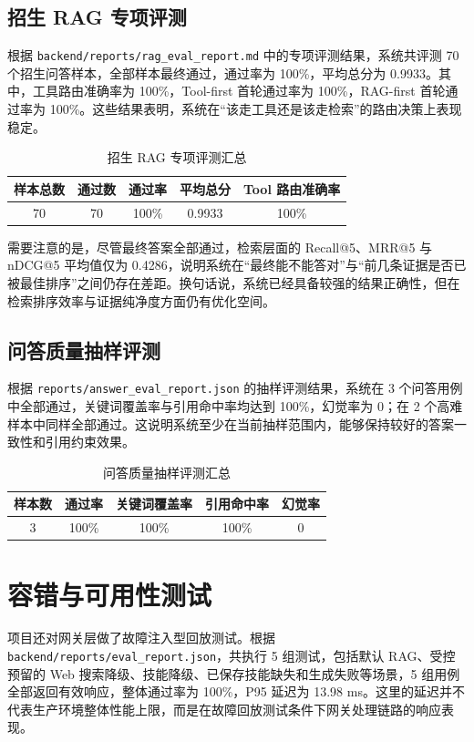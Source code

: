 \documentclass[UTF8,zihao=-4,oneside,fontset=windows]{ctexbook}
\numberwithin{equation}{chapter}
\begin{document}
\subsection{招生 RAG 专项评测}
根据 \texttt{backend/reports/rag\_eval\_report.md} 中的专项评测结果，系统共评测 70 个招生问答样本，全部样本最终通过，通过率为 100\%，平均总分为 0.9933\cite{ragevalreport}。其中，工具路由准确率为 100\%，Tool-first 首轮通过率为 100\%，RAG-first 首轮通过率为 100\%。这些结果表明，系统在“该走工具还是该走检索”的路由决策上表现稳定。

\begin{table}[H]
  \centering
  \caption{招生 RAG 专项评测汇总}
  \begin{tabular}{ccccc}
    \toprule
    样本总数 & 通过数 & 通过率 & 平均总分 & Tool 路由准确率 \\
    \midrule
    70 & 70 & 100\% & 0.9933 & 100\% \\
    \bottomrule
  \end{tabular}
\end{table}

需要注意的是，尽管最终答案全部通过，检索层面的 Recall@5、MRR@5 与 nDCG@5 平均值仅为 0.4286，说明系统在“最终能不能答对”与“前几条证据是否已被最佳排序”之间仍存在差距\cite{ragevalreport}。换句话说，系统已经具备较强的结果正确性，但在检索排序效率与证据纯净度方面仍有优化空间。

\subsection{问答质量抽样评测}
根据 \texttt{reports/answer\_eval\_report.json} 的抽样评测结果，系统在 3 个问答用例中全部通过，关键词覆盖率与引用命中率均达到 100\%，幻觉率为 0；在 2 个高难样本中同样全部通过\cite{answerevalreport}。这说明系统至少在当前抽样范围内，能够保持较好的答案一致性和引用约束效果。

\begin{table}[H]
  \centering
  \caption{问答质量抽样评测汇总}
  \begin{tabular}{ccccc}
    \toprule
    样本数 & 通过率 & 关键词覆盖率 & 引用命中率 & 幻觉率 \\
    \midrule
    3 & 100\% & 100\% & 100\% & 0 \\
    \bottomrule
  \end{tabular}
\end{table}

\section{容错与可用性测试}
项目还对网关层做了故障注入型回放测试。根据 \texttt{backend/reports/eval\_report.json}，共执行 5 组测试，包括默认 RAG、受控预留的 Web 搜索降级、技能降级、已保存技能缺失和生成失败等场景，5 组用例全部返回有效响应，整体通过率为 100\%，P95 延迟为 13.98 ms\cite{gateevalreport}。这里的延迟并不代表生产环境整体性能上限，而是在故障回放测试条件下网关处理链路的响应表现。
\end{document}
